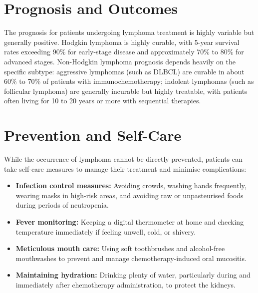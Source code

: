 \section*{Prognosis and Outcomes}
The prognosis for patients undergoing lymphoma treatment is highly variable but generally positive. Hodgkin lymphoma is highly curable, with 5-year survival rates exceeding 90\% for early-stage disease and approximately 70\% to 80\% for advanced stages. Non-Hodgkin lymphoma prognosis depends heavily on the specific subtype: aggressive lymphomas (such as DLBCL) are curable in about 60\% to 70\% of patients with immunochemotherapy; indolent lymphomas (such as follicular lymphoma) are generally incurable but highly treatable, with patients often living for 10 to 20 years or more with sequential therapies.

\section*{Prevention and Self-Care}
While the occurrence of lymphoma cannot be directly prevented, patients can take self-care measures to manage their treatment and minimise complications:
\begin{itemize}
    \item \textbf{Infection control measures:} Avoiding crowds, washing hands frequently, wearing masks in high-risk areas, and avoiding raw or unpasteurised foods during periods of neutropenia.
    \item \textbf{Fever monitoring:} Keeping a digital thermometer at home and checking temperature immediately if feeling unwell, cold, or shivery.
    \item \textbf{Meticulous mouth care:} Using soft toothbrushes and alcohol-free mouthwashes to prevent and manage chemotherapy-induced oral mucositis.
    \item \textbf{Maintaining hydration:} Drinking plenty of water, particularly during and immediately after chemotherapy administration, to protect the kidneys.
\end{itemize}

